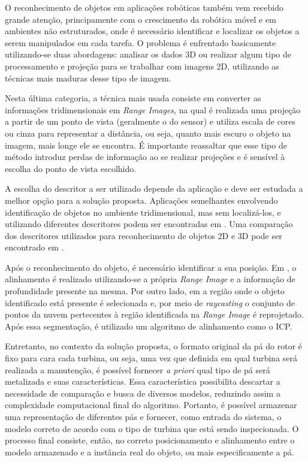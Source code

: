 O reconhecimento de objetos em aplicações robóticas também vem recebido
grande atenção, principamente com o crescimento da robótica móvel e em ambientes
não estruturados, onde é necessário identificar e localizar os objetos a serem
manipulados em cada tarefa. O problema é enfrentado basicamente utilizando-se
duas abordagens: analisar os dados 3D ou realizar algum tipo de processamento e
projeção para se trabalhar com imagens 2D, utilizando as técnicas mais maduras
desse tipo de imagem.


Nesta última categoria, a técnica
mais usada consiste em converter as informações tridimensionais em \textit{Range
Images}, na qual é realizada uma projeção a partir de um ponto de vista (geralmente o do sensor) e utiliza escala
de cores ou cinza para representar a distância, ou seja, quanto mais escuro o
objeto na imagem, mais longe ele se encontra. É importante reassaltar que esse
tipo de método introduz perdas de informação ao se realizar projeções e é
sensível à escolha do ponto de vista escolhido. 

A escolha do descritor a ser utilizado depende da aplicação e deve ser estudada
a melhor opção para a solução proposta. Aplicações semelhantes envolvendo
identificação de objetos no ambiente tridimensional, mas sem localizá-los, e
utilizando diferentes descritores podem ser encontradas em
\cite{Bayramoglu2010,Hetzel2001,Chen2007}. Uma comparação dos descritores
utilizados para reconhecimento de objetos 2D e 3D pode ser encontrado em
\cite{Zaharia2004, Weber2014}.

Após o reconhecimento do objeto, é necessário identificar a sua posição.
Em \cite{Steder2009}, o alinhamento é realizado utilizando-se a própria
\textit{Range Image} e a informação de profundidade presente na mesma. Por outro
lado, em \cite{Nuchter2005} a região onde o objeto identificado está presente é
selecionada e, por meio de \textit{raycasting} o conjunto de pontos da nuvem
pertecentes à região identificada na \textit{Range Image} é reprojetado. Após
essa segmentação, é utilizado um algoritmo de alinhamento como o ICP. 


Entretanto, no contexto da solução proposta, o formato original da pá do rotor é fixo para cara cada turbina, ou
seja, uma vez que definida em qual turbina será realizada a manutenção, é possível fornecer \textit{a priori} qual tipo de pá será metalizada e suas
características. Essa característica possibilita descartar a necessidade de comparação e busca de
diversos modelos, reduzindo assim a complexidade computacional final do
algoritmo. Portanto, é possível armazenar uma representação de diferentes pás e
fornecer, como entrada do sistema, o modelo correto de acordo com o tipo de turbina que
está sendo inspecionada. O processo final consiste, então, no correto
posicionamento e alinhamento entre o modelo armazenado e a instância real do
objeto, ou mais especificamente a pá.

